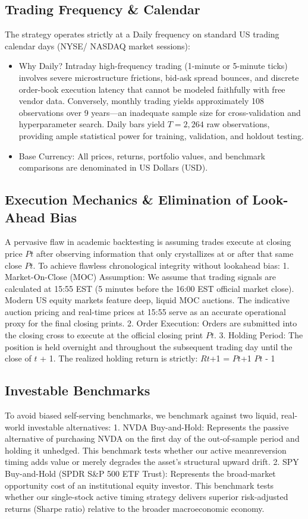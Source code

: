 \documentclass[12pt, a4paper]{article}
\begin{document}
\subsection{Trading Frequency \& Calendar}
The strategy operates strictly at a Daily frequency  on standard US trading calendar days (NYSE/
NASDAQ market sessions):
\begin{itemize}
\item Why Daily? Intraday high-frequency trading (1-minute or 5-minute ticks) involves severe microstructure frictions, bid-ask spread bounces, and discrete order-book execution latency that cannot be 
modeled faithfully with free vendor data. Conversely, monthly trading yields approximately 108 
observations over 9 years---an inadequate sample size for cross-validation and hyperparameter search. 
Daily bars yield $T = 2,264$ raw observations, providing ample statistical power for training, validation, and holdout testing.
\item Base Currency: All prices, returns, portfolio values, and benchmark comparisons are denominated in 
US Dollars (USD).
\end{itemize}

\subsection{Execution Mechanics \& Elimination of Look-Ahead Bias}
A pervasive flaw in academic backtesting is assuming trades execute at closing price $Pt$ after observing 
information that only crystallizes at or after that same close $Pt$. To achieve flawless chronological 
integrity without lookahead bias:
1. Market-On-Close (MOC) Assumption: We assume that trading signals are calculated at 15:55 EST 
(5 minutes before the 16:00 EST official market close). Modern US equity markets feature deep, 
liquid MOC auctions. The indicative auction pricing and real-time prices at 15:55 serve as an accurate 
operational proxy for the final closing prints.
2. Order Execution: Orders are submitted into the closing cross to execute at the official closing print 
$Pt$.
3. Holding Period: The position is held overnight and throughout the subsequent trading day until the 
close of $t$ + 1. The realized holding return is strictly:
$R${$t$+1} =
$P${$t$+1}
$Pt$
- 1

\subsection{Investable Benchmarks}
To avoid biased self-serving benchmarks, we benchmark against two liquid, real-world investable alternatives:
1. NVDA Buy-and-Hold: Represents the passive alternative of purchasing NVDA on the first day of 
the out-of-sample period and holding it unhedged. This benchmark tests whether our active meanreversion timing adds value or merely degrades the asset's structural upward drift.
2. SPY Buy-and-Hold (SPDR S\&P 500 ETF Trust): Represents the broad-market opportunity cost of 
an institutional equity investor. This benchmark tests whether our single-stock active timing strategy 
delivers superior risk-adjusted returns (Sharpe ratio) relative to the broader macroeconomic economy.
\end{document}
